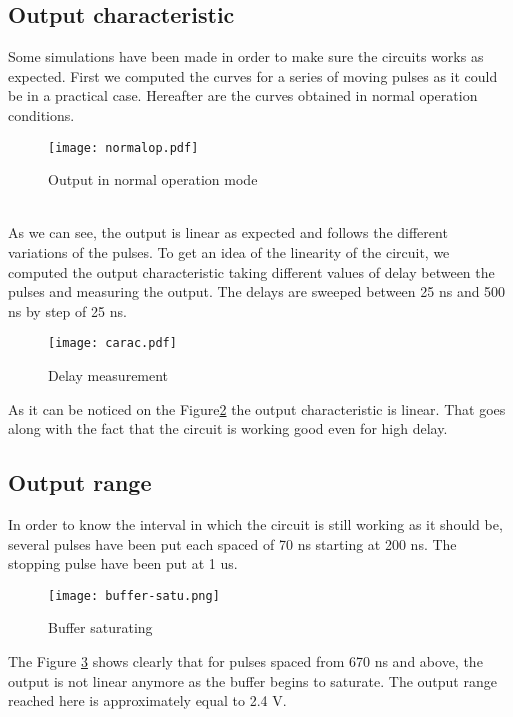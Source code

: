 
\subsection{Output characteristic}
Some simulations have been made in order to make sure the circuits works as expected. First we computed the curves for a series of moving pulses as it could be in a practical case. Hereafter are the curves obtained in normal operation conditions. 
\begin{figure}[!ht]
\texttt{[image: normalop.pdf]}
\label{normal_op}
\caption{Output in normal operation mode}
\end{figure}
\\
As we can see, the output is linear as expected and follows the different variations of the pulses.
To get an idea of the linearity of the circuit, we computed the output characteristic taking different values of delay between the pulses and measuring the output. The delays are sweeped between 25 ns and 500 ns by step of 25 ns.
\newpage
\begin{figure}[!ht]
\texttt{[image: carac.pdf]}
\label{caract}
\caption{Delay measurement}
\end{figure}
As it can be noticed on the Figure\ref{caract} the output characteristic is linear. That goes along with the fact that the circuit is working good even for high delay.
\subsection{Output range}
In order to know the interval in which the circuit is still working as it should be, several pulses have been put each spaced of 70 ns starting at 200 ns. The stopping pulse have been put at 1 us.
\begin{figure}[!ht]
\texttt{[image: buffer-satu.png]}
\label{buffer_satu}
\caption{Buffer saturating}
\end{figure}

The Figure \ref{buffer_satu} shows clearly that for pulses spaced from 670 ns and above, the output is not linear anymore as the buffer begins to saturate. The output range reached here is approximately equal to 2.4 V. 